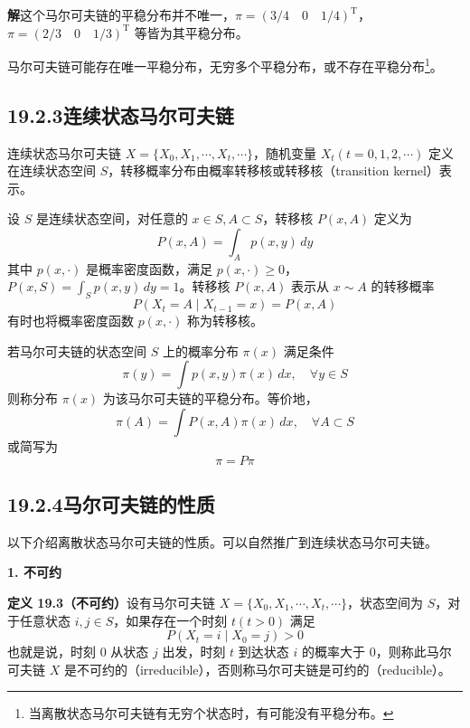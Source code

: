 \documentclass[UTF8,12pt,a4paper,fontset=fandol]{ctexart}
\begin{document}
\noindent\textbf{解}\quad 这个马尔可夫链的平稳分布并不唯一，$\pi=(3/4\quad 0\quad 1/4)^{\mathrm{T}}$，$\pi=(2/3\quad 0\quad 1/3)^{\mathrm{T}}$ 等皆为其平稳分布。

马尔可夫链可能存在唯一平稳分布，无穷多个平稳分布，或不存在平稳分布\footnote{当离散状态马尔可夫链有无穷个状态时，有可能没有平稳分布。}。

\subsection*{19.2.3\quad 连续状态马尔可夫链}

连续状态马尔可夫链 $X=\{X_0,X_1,\cdots,X_t,\cdots\}$，随机变量 $X_t(t=0,1,2,\cdots)$ 定义在连续状态空间 $S$，转移概率分布由概率转移核或转移核（transition kernel）表示。

设 $S$ 是连续状态空间，对任意的 $x\in S,A\subset S$，转移核 $P(x,A)$ 定义为
\begin{equation}
P(x,A)=\int_A p(x,y)\,dy
\tag{19.19}
\end{equation}
其中 $p(x,\cdot)$ 是概率密度函数，满足 $p(x,\cdot)\geqslant 0$，$P(x,S)=\int_S p(x,y)\,dy=1$。转移核 $P(x,A)$ 表示从 $x\sim A$ 的转移概率
\begin{equation}
P(X_t=A\mid X_{t-1}=x)=P(x,A)
\tag{19.20}
\end{equation}
有时也将概率密度函数 $p(x,\cdot)$ 称为转移核。

若马尔可夫链的状态空间 $S$ 上的概率分布 $\pi(x)$ 满足条件
\begin{equation}
\pi(y)=\int p(x,y)\pi(x)\,dx,\quad \forall y\in S
\tag{19.21}
\end{equation}
则称分布 $\pi(x)$ 为该马尔可夫链的平稳分布。等价地，
\begin{equation}
\pi(A)=\int P(x,A)\pi(x)\,dx,\quad \forall A\subset S
\tag{19.22}
\end{equation}
或简写为
\begin{equation}
\pi=P\pi
\tag{19.23}
\end{equation}

\subsection*{19.2.4\quad 马尔可夫链的性质}

以下介绍离散状态马尔可夫链的性质。可以自然推广到连续状态马尔可夫链。

\noindent\textbf{1. 不可约}

\noindent\textbf{定义 19.3（不可约）}\quad 设有马尔可夫链 $X=\{X_0,X_1,\cdots,X_t,\cdots\}$，状态空间为 $S$，对于任意状态 $i,j\in S$，如果存在一个时刻 $t(t>0)$ 满足
\begin{equation}
P(X_t=i\mid X_0=j)>0
\tag{19.24}
\end{equation}
也就是说，时刻 0 从状态 $j$ 出发，时刻 $t$ 到达状态 $i$ 的概率大于 0，则称此马尔可夫链 $X$ 是不可约的（irreducible），否则称马尔可夫链是可约的（reducible）。
\end{document}
